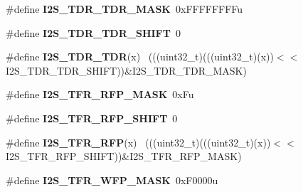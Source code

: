 \begin{DoxyCompactItemize}
\item 
\hypertarget{group___i2_s___register___masks_gaa3e1fe9a61d8485d2d6968dfcf779502}{}\#define {\bfseries I2\+S\+\_\+\+T\+D\+R\+\_\+\+T\+D\+R\+\_\+\+M\+A\+S\+K}~0x\+F\+F\+F\+F\+F\+F\+F\+Fu\label{group___i2_s___register___masks_gaa3e1fe9a61d8485d2d6968dfcf779502}

\item 
\hypertarget{group___i2_s___register___masks_gacf46b25f4f14b34413430bc2071c1a13}{}\#define {\bfseries I2\+S\+\_\+\+T\+D\+R\+\_\+\+T\+D\+R\+\_\+\+S\+H\+I\+F\+T}~0\label{group___i2_s___register___masks_gacf46b25f4f14b34413430bc2071c1a13}

\item 
\hypertarget{group___i2_s___register___masks_gaa6d27f63a2f11cf4850c33305fc152e6}{}\#define {\bfseries I2\+S\+\_\+\+T\+D\+R\+\_\+\+T\+D\+R}(x)                                                  ~(((uint32\+\_\+t)(((uint32\+\_\+t)(x))$<$$<$I2\+S\+\_\+\+T\+D\+R\+\_\+\+T\+D\+R\+\_\+\+S\+H\+I\+F\+T))\&I2\+S\+\_\+\+T\+D\+R\+\_\+\+T\+D\+R\+\_\+\+M\+A\+S\+K)\label{group___i2_s___register___masks_gaa6d27f63a2f11cf4850c33305fc152e6}

\item 
\hypertarget{group___i2_s___register___masks_ga7c4e30b6d86edce6e8767f7800ef88a4}{}\#define {\bfseries I2\+S\+\_\+\+T\+F\+R\+\_\+\+R\+F\+P\+\_\+\+M\+A\+S\+K}~0x\+Fu\label{group___i2_s___register___masks_ga7c4e30b6d86edce6e8767f7800ef88a4}

\item 
\hypertarget{group___i2_s___register___masks_ga9eee8668c1cef6c911103d45234930b3}{}\#define {\bfseries I2\+S\+\_\+\+T\+F\+R\+\_\+\+R\+F\+P\+\_\+\+S\+H\+I\+F\+T}~0\label{group___i2_s___register___masks_ga9eee8668c1cef6c911103d45234930b3}

\item 
\hypertarget{group___i2_s___register___masks_ga3b841d152646413b50bcc91da6263560}{}\#define {\bfseries I2\+S\+\_\+\+T\+F\+R\+\_\+\+R\+F\+P}(x)                                                  ~(((uint32\+\_\+t)(((uint32\+\_\+t)(x))$<$$<$I2\+S\+\_\+\+T\+F\+R\+\_\+\+R\+F\+P\+\_\+\+S\+H\+I\+F\+T))\&I2\+S\+\_\+\+T\+F\+R\+\_\+\+R\+F\+P\+\_\+\+M\+A\+S\+K)\label{group___i2_s___register___masks_ga3b841d152646413b50bcc91da6263560}

\item 
\hypertarget{group___i2_s___register___masks_gae62f96d35bbfdc150f3d3cc9a0a27077}{}\#define {\bfseries I2\+S\+\_\+\+T\+F\+R\+\_\+\+W\+F\+P\+\_\+\+M\+A\+S\+K}~0x\+F0000u\label{group___i2_s___register___masks_gae62f96d35bbfdc150f3d3cc9a0a27077}


\end{DoxyCompactItemize}
